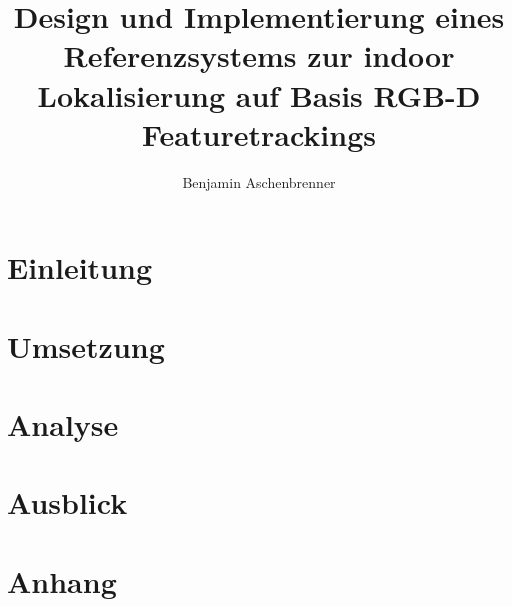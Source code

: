 \documentclass[ngerman, paper=a4, 11pt, cleardoubleempty, twoside, openright, BCOR=7mm, DIV12, idxtotoc, liststotoc, bibtotoc, headinclude=false]{scrreprt}
\title{Design und Implementierung eines Referenzsystems zur indoor Lokalisierung auf Basis RGB-D Featuretrackings}
\author{Benjamin Aschenbrenner}
\begin{document}
	\maketitle
	\cleardoublepage
	
	\affirmation
	
	\cleardoublepage
	
	\tableofcontents
	\listoffigures
	\listoftables
	\lstlistoflistings
	\printglossaries
  \cleardoublepage
    
	\chapter{Einleitung} 
	\label{cha:einleitung}
	
	
	

	\chapter{Umsetzung} 
	\label{cha:umsetzung}
	
	
	

	\chapter{Analyse} 
	\label{cha:analyse}
	
	
	

	\chapter{Ausblick} 
	\label{cha:ausblick}
	

	\chapter{Anhang}
	\label{cha:anhang}
	

	
	
	
	
\end{document}
